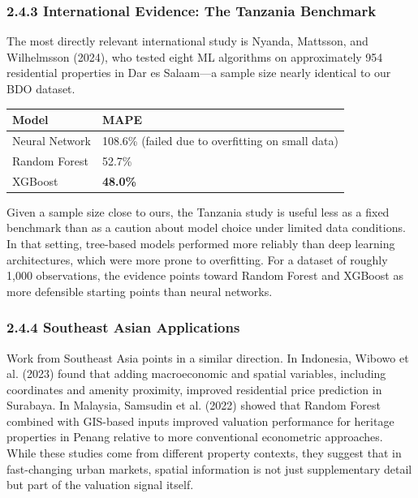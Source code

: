 \subsubsection{\texorpdfstring{\textbf{2.4.3 International Evidence: The Tanzania Benchmark}}{2.4.3 International Evidence: The Tanzania Benchmark}}\label{international-evidence-the-tanzania-benchmark}

The most directly relevant international study is Nyanda, Mattsson, and Wilhelmsson (2024), who tested eight ML algorithms on approximately 954 residential properties in Dar es Salaam---a sample size nearly identical to our BDO dataset.

\begin{center}
\begin{tabular}{p{} p{}}
\toprule
Model & MAPE \\
\midrule
Neural Network & 108.6\% (failed due to overfitting on small data) \\
Random Forest & 52.7\% \\
XGBoost & \textbf{48.0\%} \\
\bottomrule
\end{tabular}
\end{center}

Given a sample size close to ours, the Tanzania study is useful less as a fixed benchmark than as a caution about model choice under limited data conditions. In that setting, tree-based models performed more reliably than deep learning architectures, which were more prone to overfitting. For a dataset of roughly 1,000 observations, the evidence points toward Random Forest and XGBoost as more defensible starting points than neural networks.

\subsubsection{\texorpdfstring{\textbf{2.4.4 Southeast Asian Applications}}{2.4.4 Southeast Asian Applications}}\label{southeast-asian-applications}

Work from Southeast Asia points in a similar direction. In Indonesia, Wibowo et al. (2023) found that adding macroeconomic and spatial variables, including coordinates and amenity proximity, improved residential price prediction in Surabaya. In Malaysia, Samsudin et al. (2022) showed that Random Forest combined with GIS-based inputs improved valuation performance for heritage properties in Penang relative to more conventional econometric approaches. While these studies come from different property contexts, they suggest that in fast-changing urban markets, spatial information is not just supplementary detail but part of the valuation signal itself.

